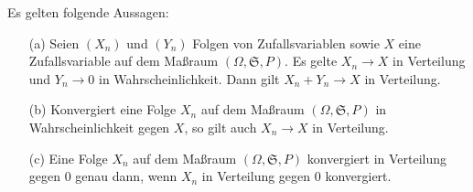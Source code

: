 \begin{lemma}
    Es gelten folgende Aussagen:
    \begin{itemize}
        \item[(a)] Seien $(X_n)$ und $(Y_n)$ Folgen von Zufallsvariablen sowie $X$ eine Zufallsvariable auf dem Maßraum $(\Omega,\mathfrak{S},P)$. Es gelte $X_n\to X$ in Verteilung und $Y_n\to 0$ in Wahrscheinlichkeit. Dann gilt $X_n+Y_n\to X$ in Verteilung.
        \item[(b)] Konvergiert eine Folge $X_n$ auf dem Maßraum $(\Omega,\mathfrak{S},P)$ in Wahrscheinlichkeit gegen $X$, so gilt auch $X_n\to X$ in Verteilung.
        \item[(c)] Eine Folge $X_n$ auf dem Maßraum $(\Omega,\mathfrak{S},P)$ konvergiert in Verteilung gegen $0$ genau dann, wenn $X_n$ in Verteilung gegen 0 konvergiert.
    \end{itemize}
\end{lemma}
